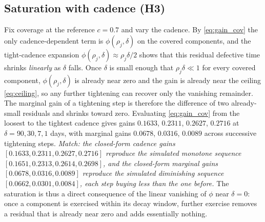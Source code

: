 \documentclass[journal]{IEEEtran}
\begin{document}
\subsection{Saturation with cadence (H3)}
Fix coverage at the reference $c = 0.7$ and vary the cadence. By \eqref{eq:gain_cov} the only
cadence-dependent term is $\phi(\rho_j, \delta)$ on the covered components, and the tight-cadence
expansion $\phi(\rho_j, \delta) \approx \rho_j \delta / 2$ shows that this residual defective time
shrinks \emph{linearly} as $\delta$ falls. Once $\delta$ is small enough that $\rho_j \delta \ll 1$
for every covered component, $\phi(\rho_j, \delta)$ is already near zero and the gain is already near
the ceiling \eqref{eq:ceiling}, so any further tightening can recover only the vanishing remainder.
The marginal gain of a tightening step is therefore the difference of two already-small residuals and
shrinks toward zero. Evaluating \eqref{eq:gain_cov} from the loosest to the tightest cadence gives
gains $0.1633$, $0.2311$, $0.2627$, $0.2716$ at $\delta = 90, 30, 7, 1$ days, with marginal gains
$0.0678$, $0.0316$, $0.0089$ across successive tightening steps. \emph{Match: the closed-form cadence
gains $[0.1633, 0.2311, 0.2627, 0.2716]$ reproduce the simulated monotone sequence $[0.1651, 0.2313,
0.2614, 0.2698]$, and the closed-form marginal gains $[0.0678, 0.0316, 0.0089]$ reproduce the
simulated diminishing sequence $[0.0662, 0.0301, 0.0084]$, each step buying less than the one before.}
The saturation is thus a direct consequence of the linear vanishing of $\phi$ near $\delta = 0$: once
a component is exercised within its decay window, further exercise removes a residual that is already
near zero and adds essentially nothing.
\end{document}
